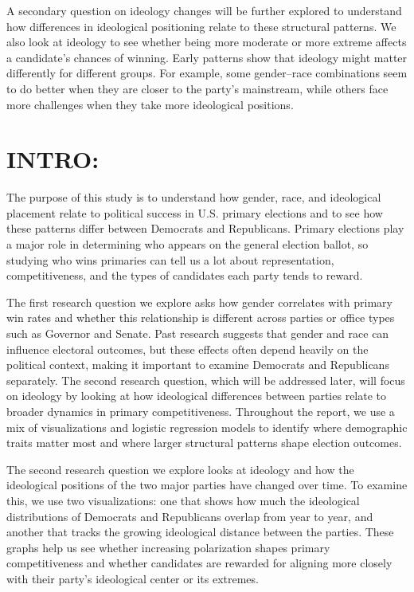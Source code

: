 \documentclass[
]{article}
\begin{document}
A secondary question on ideology changes will be further explored to
understand how differences in ideological positioning relate to these
structural patterns. We also look at ideology to see whether being more
moderate or more extreme affects a candidate's chances of winning. Early
patterns show that ideology might matter differently for different
groups. For example, some gender--race combinations seem to do better
when they are closer to the party's mainstream, while others face more
challenges when they take more ideological positions.

\section{INTRO:}\label{intro}

The purpose of this study is to understand how gender, race, and
ideological placement relate to political success in U.S. primary
elections and to see how these patterns differ between Democrats and
Republicans. Primary elections play a major role in determining who
appears on the general election ballot, so studying who wins primaries
can tell us a lot about representation, competitiveness, and the types
of candidates each party tends to reward.

The first research question we explore asks how gender correlates with
primary win rates and whether this relationship is different across
parties or office types such as Governor and Senate. Past research
suggests that gender and race can influence electoral outcomes, but
these effects often depend heavily on the political context, making it
important to examine Democrats and Republicans separately. The second
research question, which will be addressed later, will focus on ideology
by looking at how ideological differences between parties relate to
broader dynamics in primary competitiveness. Throughout the report, we
use a mix of visualizations and logistic regression models to identify
where demographic traits matter most and where larger structural
patterns shape election outcomes.

The second research question we explore looks at ideology and how the
ideological positions of the two major parties have changed over time.
To examine this, we use two visualizations: one that shows how much the
ideological distributions of Democrats and Republicans overlap from year
to year, and another that tracks the growing ideological distance
between the parties. These graphs help us see whether increasing
polarization shapes primary competitiveness and whether candidates are
rewarded for aligning more closely with their party's ideological center
or its extremes.
\end{document}
